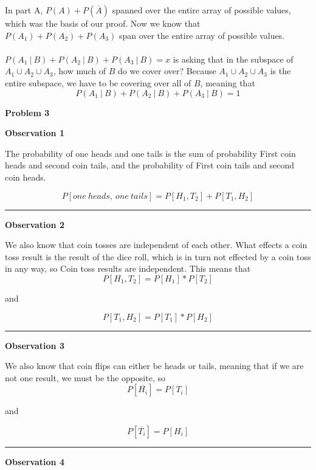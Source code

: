 \documentclass[11pt]{article}
\begin{document}
\begin{enumerate}
In part A, $P(A) + P(\overline{A})$ spanned over the entire array of possible values, which was the basis of our proof.  Now we know that $P(A_1) + P(A_2) + P(A_3)$ span over the entire array of possible values. \\ \\
$P(A_1\ |\ B) + P(A_2\ |\ B) + P(A_3\ |\ B) = x$ is asking that in the subspace of $A_1 \cup A_2 \cup A_3$, how much of $B$ do we cover over?  Because $A_1 \cup A_2 \cup A_3$ is the entire subspace, we have to be covering over all of $B$, meaning that $$P(A_1\ |\ B) + P(A_2\ |\ B) + P(A_3\ |\ B) = 1$$
\end{enumerate}
\newpage
\textbf{Problem 3}
\\
\begin{center}
\textbf{Observation 1}
\end{center}
The probability of one heads and one tails is the sum of probability First coin heads and second coin tails, and the probability of First coin tails and second coin heads.

$$P[one\ heads,\ one\ tails] = P[H_1,T_2] + P[T_1, H_2]$$
\noindent\rule{20cm}{0.4pt}
\begin{center}
\textbf{Observation 2}
\end{center}
We also know that coin tosses are independent of each other.  What effects a coin toss result is the result of the dice roll, which is in turn not effected by a coin toss in any way, so Coin toss results are independent. This means that 
\\

$$ P[H_1, T_2] = P[H_1] * P[T_2]$$
\begin{center}
and
\end{center}
$$ P[T_1, H_2] = P[T_1] * P[H_2]$$
\noindent\rule{20cm}{0.4pt}
\begin{center}
\textbf{Observation 3}
\end{center}
We also know that coin flips can either be heads or tails, meaning that if we are not one result, we must be the opposite, so 
$$P[\overline{H_i}] = P[T_i]$$
\begin{center}
and
\end{center}
$$P[\overline{T_i}] = P[H_i]$$
\noindent\rule{20cm}{0.4pt}
\begin{center}
\textbf{Observation 4}
\end{center}
\end{document}
